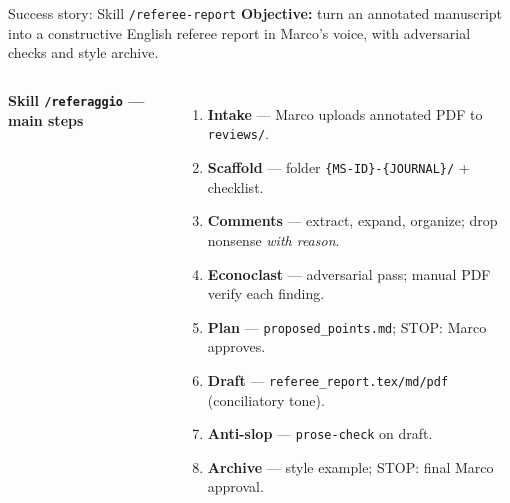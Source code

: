 
\begin{frame}[t]{Success story: Skill \texttt{/referee-report}}
  \footnotesize
  \textbf{Objective:} turn an annotated manuscript into a constructive English referee report in Marco's voice, with adversarial checks and style archive.
  \vspace{0.2cm}
  \begin{columns}[T,onlytextwidth]
      \textbf{Skill \texttt{/referaggio} --- main steps}
      \begin{enumerate}\setlength\itemsep{0.18em}
        \item \textbf{Intake} --- Marco uploads annotated PDF to \texttt{reviews/}.
        \item \textbf{Scaffold} --- folder \texttt{\{MS-ID\}-\{JOURNAL\}/} + checklist.
        \item \textbf{Comments} --- extract, expand, organize; drop nonsense \emph{with reason}.
        \item \textbf{Econoclast} --- adversarial pass; \alert{manual PDF verify} each finding.
        \item \textbf{Plan} --- \texttt{proposed\_points.md}; \alert{STOP: Marco approves}.
        \item \textbf{Draft} --- \texttt{referee\_report.tex/md/pdf} (conciliatory tone).
        \item \textbf{Anti-slop} --- \texttt{prose-check} on draft.
        \item \textbf{Archive} --- style example; \alert{STOP: final Marco approval}.
      \end{enumerate}
    
  \end{columns}
\end{frame}

